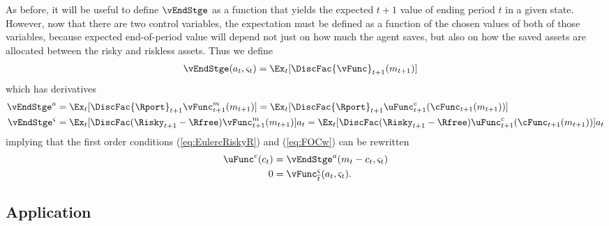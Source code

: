 \documentclass[titlepage, headings=optiontotocandhead]{\econtex}
\begin{document}
As before, it will be useful to define $\vEndStge$ as a function that
yields the expected $t+1$ value of ending period $t$ in a given state.
However, now that there are two control variables, the expectation
must be defined as a function of the chosen values of both of those
variables, because expected end-of-period value will depend not just
on how much the agent saves, but also on how the saved assets are
allocated between the risky and riskless assets.  Thus we define
\begin{equation*}\begin{gathered}\begin{aligned}
      \vEndStge({a}_{t},\varsigma_{t})  & = \Ex_{t}[\DiscFac {\vFunc}_{t+1}({m}_{t+1})]
    \end{aligned}\end{gathered}\end{equation*}
which has derivatives
\begin{equation}\begin{gathered}\begin{aligned}
      \vEndStge^{{a}}  & = \Ex_{t}[\DiscFac {\Rport}_{t+1}{\vFunc}_{t+1}^{m}({m}_{t+1})] = \Ex_{t}[\DiscFac {\Rport}_{t+1}{\uFunc}_{t+1}^{{c}}(\cFunc_{t+1}({m}_{t+1}))]
      \\      \vEndStge^{\varsigma}  & = \Ex_{t}[\DiscFac (\Risky_{t+1}-\Rfree){\vFunc}_{t+1}^{m}({m}_{t+1})  ]a_{t} = \Ex_{t}[\DiscFac (\Risky_{t+1}-\Rfree){\uFunc}_{t+1}^{{c}}(\cFunc_{t+1}({m}_{t+1}))  ]a_{t} \notag
    \end{aligned}\end{gathered}\end{equation}
implying that the first order conditions (\ref{eq:EulercRiskyR}) and
(\ref{eq:FOCw}) can be rewritten
\begin{equation}\begin{gathered}\begin{aligned}
      \uFunc^{{c}}({c}_{t})  & = \vEndStge^{{a}}({m}_{t}-{c}_{t},\varsigma_{t})
      \\      0  & = \vFunc^{\varsigma}_{\overline{t}}({a}_{t},\varsigma_{t}).
    \end{aligned}\end{gathered}\end{equation}

\subsection{Application}\label{subsec:MCApplication}
\end{document}
